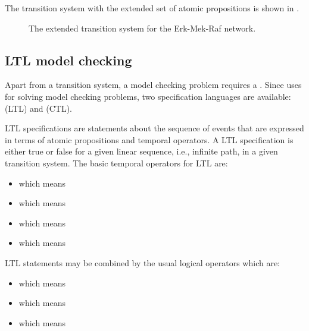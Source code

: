 \documentclass[letterpaper,10pt,english]{sphinxmanual}
\begin{document}
The transition system with the extended set of atomic propositions is shown in {\hyperref[\detokenize{Manual:figure18}]{}}.

\begin{figure}[htbp]
\centering
\capstart

\noindent{}
\caption{The extended transition system for the Erk-Mek-Raf network.}\label{\detokenize{Manual:figure18}}\label{\detokenize{Manual:id22}}\end{figure}


\subsection{LTL model checking}
\label{\detokenize{Manual:ltl-model-checking}}
Apart from a transition system, a model checking problem requires a .
Since  uses {\hyperref[\detokenize{Installation:installation-nusmv}]{}} for solving model checking problems, two specification languages are available:
 (LTL) and  (CTL).

LTL specifications are statements about the sequence of events that are expressed in terms of atomic propositions and temporal operators.
A LTL specification is either true or false for a given linear sequence, i.e., infinite path, in a given transition system.
The basic temporal operators for LTL are:
\begin{itemize}
\item {} 
 which means 

\item {} 
 which means 

\item {} 
\sphinxstyleemphasis{{[}..U..{]}} which means 

\item {} 
 which means 

\end{itemize}

LTL statements may be combined by the usual logical operators which are:
\begin{itemize}
\item {} 
\sphinxstyleemphasis{\textbar{}} which means 

\item {} 
\sphinxstyleemphasis{\&} which means 

\item {} 
\sphinxstyleemphasis{!} which means 

\end{itemize}
\end{document}
